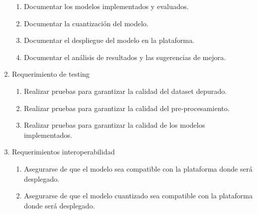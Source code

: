 \documentclass[
11pt, %
codirector, %
]{charter}
\begin{document}
\begin{enumerate}
\begin{enumerate}
			\item Documentar los modelos implementados y evaluados.
			\item Documentar la cuantización del modelo.
			\item Documentar el despliegue del modelo en la plataforma.
			\item Documentar el análisis de resultados y las sugerencias de mejora.
		\end{enumerate}
	\item Requerimiento de testing
		\begin{enumerate}
			\item Realizar pruebas para garantizar la calidad del dataset depurado. 
			\item Realizar pruebas para garantizar la calidad del pre-procesamiento. 
			\item Realizar pruebas para garantizar la calidad de los modelos implementados.
		\end{enumerate}
	\item Requerimientos interoperabilidad
			\begin{enumerate}
			\item Asegurarse de que el modelo sea compatible con la plataforma donde será desplegado.
			\item Asegurarse de que el modelo cuantizado sea compatible con la plataforma donde será desplegado.
		\end{enumerate}
\end{enumerate}
\end{document}

